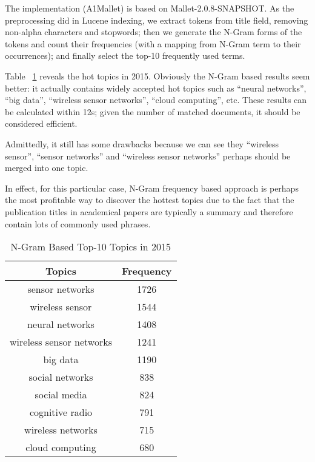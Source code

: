 The implementation (\textsf{A1Mallet}) is based on Mallet-2.0.8-SNAPSHOT. As the preprocessing did in Lucene indexing, we extract tokens from \textsf{title} field, removing non-alpha characters and stopwords; then we generate the N-Gram forms of the tokens and count their frequencies (with a mapping from N-Gram term to their occurrences); and finally select the top-10 frequently used terms.

Table ~\ref{tbl:a1-ngram} reveals the hot topics in 2015. Obviously the N-Gram based results seem better: it actually contains widely accepted hot topics such as ``neural networks'', ``big data'', ``wireless sensor networks'', ``cloud computing'', etc. These results can be calculated within 12s; given the number of matched documents, it should be considered efficient.

Admittedly, it still has some drawbacks because we can see they ``wireless sensor'', ``sensor networks'' and ``wireless sensor networks'' perhaps should be merged into one topic.

In effect, for this particular case, N-Gram frequency based approach is perhaps the most profitable way to discover the hottest topics due to the fact that the publication titles in academical papers are typically a summary and therefore contain lots of commonly used phrases.

\begin{table}[t]
\centering
\caption{N-Gram Based Top-10 Topics in 2015}
\label{tbl:a1-ngram}
\begin{tabular}{|c|c|}
\hline
\textbf{Topics}          & \textbf{Frequency} \\ \hline
sensor networks          & 1726               \\ \hline
wireless sensor          & 1544               \\ \hline
neural networks          & 1408               \\ \hline
wireless sensor networks & 1241               \\ \hline
big data                 & 1190               \\ \hline
social networks          & 838                \\ \hline
social media             & 824                \\ \hline
cognitive radio          & 791                \\ \hline
wireless networks        & 715                \\ \hline
cloud computing          & 680                \\ \hline
\end{tabular}
\end{table}


